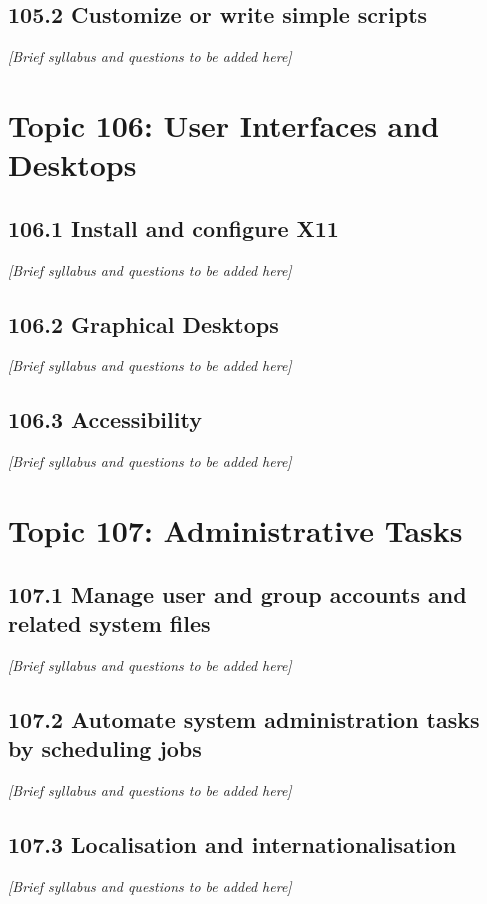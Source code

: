 \documentclass[a4paper]{report}
\begin{document}
\section{105.2 Customize or write simple scripts}
\textit{[Brief syllabus and questions to be added here]}

\chapter{Topic 106: User Interfaces and Desktops}
\section{106.1 Install and configure X11}
\textit{[Brief syllabus and questions to be added here]}

\section{106.2 Graphical Desktops}
\textit{[Brief syllabus and questions to be added here]}

\section{106.3 Accessibility}
\textit{[Brief syllabus and questions to be added here]}

\chapter{Topic 107: Administrative Tasks}
\section{107.1 Manage user and group accounts and related system files}
\textit{[Brief syllabus and questions to be added here]}

\section{107.2 Automate system administration tasks by scheduling jobs}
\textit{[Brief syllabus and questions to be added here]}

\section{107.3 Localisation and internationalisation}
\textit{[Brief syllabus and questions to be added here]}
\end{document}
